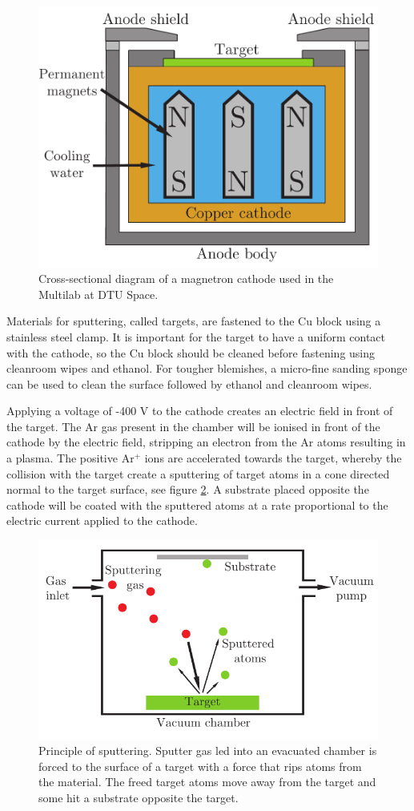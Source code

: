 \begin{figure}[htbp]
  \centering  \includegraphics[width=0.6\linewidth]{figures/chamber/cathodeintersection.pdf}
  \caption{\footnotesize Cross-sectional diagram of a magnetron cathode used in the Multilab at DTU Space. }
  \label{fig:cathodeintersection}
\end{figure}

Materials for sputtering, called targets, are fastened to the Cu block using a stainless steel clamp. It is important for the target to have a uniform contact with the cathode, so the Cu block should be cleaned before fastening using cleanroom wipes and ethanol. For tougher blemishes, a micro-fine sanding sponge can be used to clean the surface followed by ethanol and cleanroom wipes.

Applying a voltage of -400 V to the cathode creates an electric field in front of the target. The Ar gas present in the chamber will be ionised in front of the cathode by the electric field, stripping an electron from the Ar atoms resulting in a plasma. The positive Ar$^+$ ions are accelerated towards the target, whereby the collision with the target create a sputtering of target atoms in a cone directed normal to the target surface, see figure \ref{fig:sputtering}. A substrate placed opposite the cathode will be coated with the sputtered atoms at a rate proportional to the electric current applied to the cathode.

\begin{figure}[htbp]
  \centering  \includegraphics[width=0.6\linewidth]{figures/chamber/sputtering.pdf}
  \caption{\footnotesize Principle of sputtering. Sputter gas led into an evacuated chamber is forced to the surface of a target with a force that rips atoms from the material. The freed target atoms move away from the target and some hit a substrate opposite the target. }
  \label{fig:sputtering}
\end{figure}

